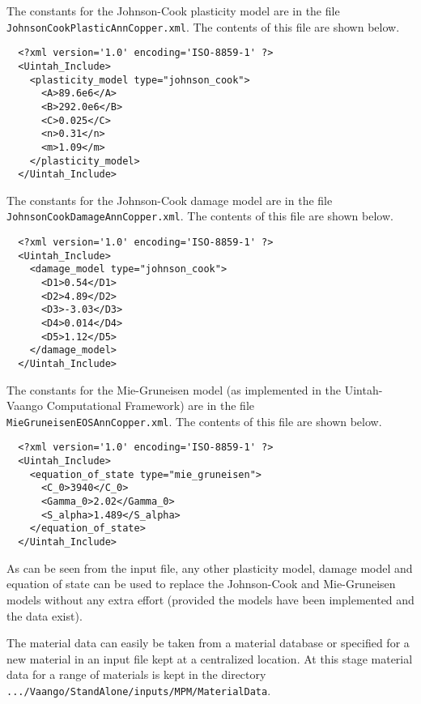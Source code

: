   The constants for the Johnson-Cook plasticity model are in the file
  \verb+JohnsonCookPlasticAnnCopper.xml+.  The contents of this file are
  shown below.
  \lstset{language=XML}
  \begin{lstlisting}
  <?xml version='1.0' encoding='ISO-8859-1' ?>
  <Uintah_Include>
    <plasticity_model type="johnson_cook">
      <A>89.6e6</A>
      <B>292.0e6</B>
      <C>0.025</C>
      <n>0.31</n>
      <m>1.09</m>
    </plasticity_model>
  </Uintah_Include>
  \end{lstlisting}

  The constants for the Johnson-Cook damage model are in the file
  \verb+JohnsonCookDamageAnnCopper.xml+.  The contents of this file are
  shown below.
  \lstset{language=XML}
  \begin{lstlisting}
  <?xml version='1.0' encoding='ISO-8859-1' ?>
  <Uintah_Include>
    <damage_model type="johnson_cook">
      <D1>0.54</D1>
      <D2>4.89</D2>
      <D3>-3.03</D3>
      <D4>0.014</D4>
      <D5>1.12</D5>
    </damage_model>
  </Uintah_Include>
  \end{lstlisting}

  The constants for the Mie-Gruneisen model (as implemented in the 
  Uintah-Vaango Computational Framework) are in the file
  \verb+MieGruneisenEOSAnnCopper.xml+.  The contents of this file are
  shown below.
  \lstset{language=XML}
  \begin{lstlisting}
  <?xml version='1.0' encoding='ISO-8859-1' ?>
  <Uintah_Include>
    <equation_of_state type="mie_gruneisen">
      <C_0>3940</C_0>
      <Gamma_0>2.02</Gamma_0>
      <S_alpha>1.489</S_alpha>
    </equation_of_state>
  </Uintah_Include>
  \end{lstlisting}

  As can be seen from the input file, any other plasticity model, damage
  model and equation of state can be used to replace the Johnson-Cook
  and Mie-Gruneisen models without any extra effort (provided the models
  have been implemented and the data exist).

  The material data can easily be taken from a material database or specified
  for a new material in an input file kept at a centralized location.  At this
  stage material data for a range of materials is kept in the directory
  \verb|.../Vaango/StandAlone/inputs/MPM/MaterialData|.

